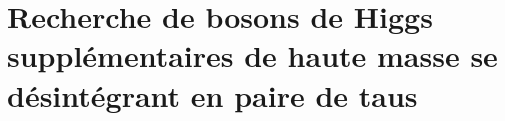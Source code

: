 \chapter[Recherche de bosons de Higgs supplémentaires de haute masse]{Recherche de bosons de Higgs supplémentaires de haute masse se désintégrant en paire de taus}\label{chapter-HTT_analysis}










